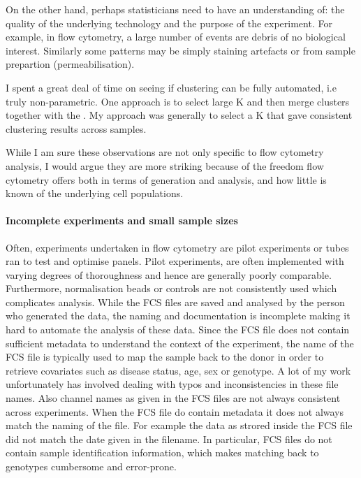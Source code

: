 On the other hand, perhaps statisticians need to have an understanding of: the quality of the underlying technology and the purpose of the experiment.
For example, in flow cytometry, a large number of events are debris of no biological interest.
Similarly some patterns may be simply staining artefacts or from sample prepartion (permeabilisation).

I spent a great deal of time on seeing if clustering can be fully automated, i.e truly non-parametric.
One approach is to select large K and then merge clusters together with the .
My approach was generally to select a K that gave consistent clustering results across samples.

While I am sure these observations are not only specific to flow cytometry analysis, I would argue they are more striking because of the freedom flow cytometry offers both in terms of generation and analysis, and how little is known of the underlying cell populations.


\paragraph{ Incomplete experiments and small sample sizes}

Often, experiments undertaken in flow cytometry are pilot experiments or tubes ran to test and optimise panels.
Pilot experiments,
are often implemented with varying degrees of thoroughness and hence are generally poorly comparable.
Furthermore, normalisation beads or controls are not consistently used which complicates analysis.
While the FCS files are saved and analysed by the person who generated the data, the naming and documentation is incomplete
making it hard to automate the analysis of these data.
Since the FCS file does not contain sufficient metadata to understand the context of the experiment, the name of the FCS file is typically used to map the sample back to the donor in order to retrieve covariates such as disease status, age, sex or genotype.
A lot of my work unfortunately has involved dealing with typos and inconsistencies in these file names.
Also channel names as given in the FCS files are not always consistent across experiments.
When the FCS file do contain metadata it does not always match the naming of the file.
For example the data as strored inside the FCS file did not match the date given in the filename.
In particular, FCS files do not contain sample identification information, which makes matching back to genotypes cumbersome and error-prone.

